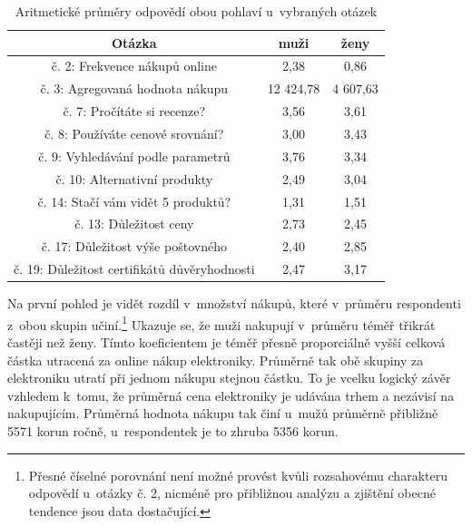 \documentclass[12pt,twoside,openany]{fithesis}
\begin{document}
                \begin{table}[htb]
                    \begin{center}%
                        \begin{tabular}{|c|c|c|}
                            \hline 
                            {{Otázka}} & {{muži}} & {{ženy}} \tabularnewline
                             \hline 
                             {{č. 2: Frekvence nákupů online}} & {{2,38}} & 
{{0,86}} \tabularnewline
                              \hline 
                              {{č. 3: Agregovaná hodnota nákupu}} & {{12 
424,78}} & {{4 607,63}} \tabularnewline
                               \hline 
                               {{č. 7: Pročítáte si recenze?}} & {{3,56}} & 
{{3,61}} \tabularnewline
                                \hline 
                                {{č. 8: Používáte cenové srovnání?}} & 
{{3,00}} & {{3,43}} \tabularnewline
                                 \hline 
                                 {{č. 9: Vyhledávání podle parametrů}} & 
{{3,76}} & {{3,34}} \tabularnewline
                                  \hline 
                                  {{č. 10: Alternativní produkty}} & {{2,49}} 
& {{3,04}} \tabularnewline
                                   \hline 
                                   {{č. 14: Stačí vám vidět 5 produktů?}} 
& {{1,31}} & {{1,51}} \tabularnewline
                                    \hline 
                                    {{č. 13: Důležitost ceny}} & {{2,73}} & 
{{2,45}} \tabularnewline
                                     \hline 
                                     {{č. 17: Důležitost výše 
poštovného}} & {{2,40}} & {{2,85}} \tabularnewline
                                      \hline 
                                      {{č. 19: Důležitost certifikátů 
důvěryhodnosti}} & {{2,47}} & {{3,17}} \tabularnewline
                                      \hline 
                                  \end{tabular}
                                  \caption{Aritmetické průměry odpovědí obou pohlaví u~vybraných otázek}\label{tab-prumery}
                              \end{center}
                          \end{table}

                          Na první pohled je vidět rozdíl v~množství 
nákupů, které v~průměru respondenti z~obou skupin 
učiní.\footnote{
                              Přesné číselné porovnání není možné 
provést kvůli rozsahovému charakteru odpovědí u~otázky č. 2, nicméně 
pro přibližnou analýzu a zjištění obecné tendence jsou data 
dostačující.
                          }
Ukazuje se, že muži nakupují v~průměru téměř třikrát častěji než 
ženy. Tímto koeficientem je téměř přesně proporciálně vyšší 
celková částka utracená za online nákup elektroniky. Průměrně tak obě 
skupiny za elektroniku utratí při jednom nákupu stejnou částku. To je 
vcelku logický závěr vzhledem k~tomu, že průměrná cena elektroniky je 
udávána trhem a nezávisí na nakupujícím. Průměrná hodnota nákupu tak 
činí u~mužů průměrně přibližně 5571 korun ročně, u~respondentek je 
to zhruba 5356 korun.
\end{document}
